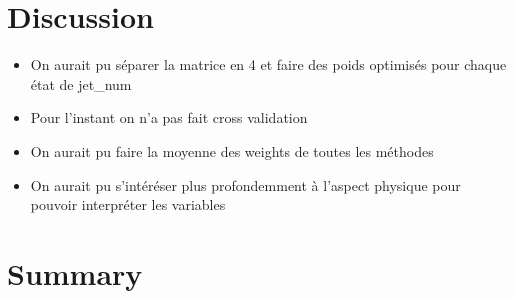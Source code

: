 \documentclass[11pt, oneside]{article}   	%
\begin{document}
\section{Discussion}
\begin{itemize}
    \item On aurait pu séparer la matrice en 4 et faire des poids optimisés pour chaque état de jet_num
    \item Pour l'instant on n'a pas fait cross validation
    \item On aurait pu faire la moyenne des weights de toutes les méthodes
    \item On aurait pu s'intéréser plus profondemment à l'aspect physique pour pouvoir interpréter les variables
\end{itemize}
\section{Summary}


\end{document}

